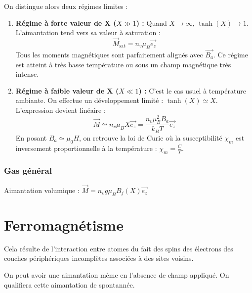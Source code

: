 \documentclass[french]{yLectureNote}
\renewcommand{\vec}{\overrightarrow}
\begin{document}
On distingue alors deux régimes limites :

\begin{enumerate}
    \item \textbf{Régime à forte valeur de X ($X \gg 1$) :} 
    Quand $X \to \infty$, $\tanh(X) \to 1$. L'aimantation tend vers sa valeur à saturation :
    $$\vec{M}_{\text{sat}} = n_v \mu_B \vec{e_z}$$
    Tous les moments magnétiques sont parfaitement alignés avec $\vec{B_a}$. Ce régime est atteint à très basse température ou sous un champ magnétique très intense.
    
    \item \textbf{Régime à faible valeur de X ($X \ll 1$) :} 
    C'est le cas usuel à température ambiante. On effectue un développement limité : $\tanh(X) \simeq X$. L'expression devient linéaire :
    $$\vec{M} \simeq n_v \mu_B X \vec{e_z} = \frac{n_v \mu_B^2 B_a}{k_B T} \vec{e_z}$$
    En posant $B_a \simeq \mu_0 H$, on retrouve la loi de Curie où la susceptibilité $\chi_m$ est inversement proportionnelle à la température : $\chi_m = \frac{C}{T}$.
\end{enumerate}




\subsubsection{Gas général}
\begin{definition}
    Aimantation volumique : $\vec{M} = n_v g\mu_B B_j(X)\vec{e_z}$

\end{definition}
\section{Ferromagnétisme}
\begin{definition}
    Cela résulte de l'interaction entre atomes du fait des spins des électrons des couches périphériques incomplètes associées à des
sites voisins.

On peut avoir une aimantation même en l'absence de champ appliqué. On qualifiera cette aimantation de spontannée.
\end{definition}
\end{document}
